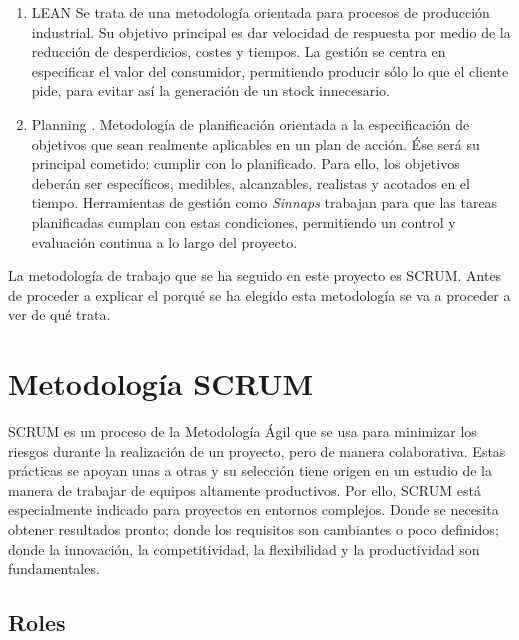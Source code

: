 \begin{enumerate}
\item LEAN \cite{LEAN} Se trata de una metodología orientada para procesos de producción industrial. Su objetivo principal es dar velocidad de respuesta por medio de la reducción de desperdicios, costes y tiempos. La gestión se centra en especificar el valor del consumidor, permitiendo producir sólo lo que el cliente pide, para evitar así la generación de un stock innecesario.

\item {} Planning \cite{SMART}. Metodología de planificación orientada a la especificación de objetivos que sean realmente aplicables en un plan de acción. Ése será su principal cometido: cumplir con lo planificado. Para ello, los objetivos deberán ser específicos, medibles, alcanzables, realistas y acotados en el tiempo. Herramientas de gestión como \emph{Sinnaps} trabajan para que las tareas planificadas cumplan con estas condiciones, permitiendo un control y evaluación continua a lo largo del proyecto.
\end{enumerate}

La metodología de trabajo que se ha seguido en este proyecto es SCRUM. Antes de proceder a explicar el porqué se ha elegido esta metodología se va a proceder a ver de qué trata.

\section{Metodología SCRUM}\label{sec:scrum}

SCRUM es un proceso de la Metodología Ágil que se usa para minimizar los riesgos durante la realización de un proyecto, pero de manera colaborativa. Estas prácticas se apoyan unas a otras y su selección tiene origen en un estudio de la manera de trabajar de equipos altamente productivos. Por ello, SCRUM está especialmente indicado para proyectos en entornos complejos. Donde se necesita obtener resultados pronto; donde los requisitos son cambiantes o poco definidos; donde la innovación, la competitividad, la flexibilidad y la productividad son fundamentales.

\subsection{Roles}

